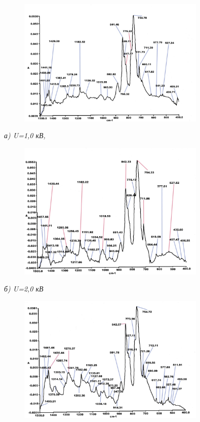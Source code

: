 \begin{figure}[H]
	\centering
	\includegraphics[width=0.8\textwidth]{assets/24}
	\caption*{}
\end{figure}

\emph{а) U=1,0 кВ,}

\begin{figure}[H]
	\centering
	\includegraphics[width=0.8\textwidth]{assets/25}
	\caption*{}
\end{figure}

\emph{б) U=2,0 кВ}

\begin{figure}[H]
	\centering
	\includegraphics[width=0.8\textwidth]{assets/26}
	\caption*{}
\end{figure}

